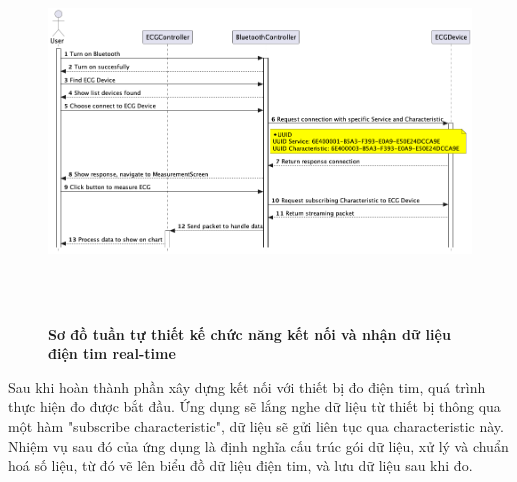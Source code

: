\begin{figure}[H]
  \centering
  \includegraphics[width=16cm,height=10cm]{Images/mobile_app/design_connect_and_receive_ECG_data.png}
  \caption[Sơ đồ tuần tự thiết kế chức năng kết nối và nhận dữ liệu điện tim real-time]{\bfseries \fontsize{12pt}{0pt}
  \selectfont Sơ đồ tuần tự thiết kế chức năng kết nối và nhận dữ liệu điện tim real-time}
  \label{seq_auth} %
\end{figure}

Sau khi hoàn thành phần xây dựng kết nối với thiết bị đo điện tim, quá trình thực hiện đo được bắt đầu. Ứng dụng sẽ lắng nghe
dữ liệu từ thiết bị thông qua một hàm "subscribe characteristic", dữ liệu sẽ gửi liên tục qua characteristic này. Nhiệm vụ sau đó của ứng dụng là
định nghĩa cấu trúc gói dữ liệu, xử lý và chuẩn hoá số liệu, từ đó vẽ lên biểu đồ dữ liệu điện tim, và lưu dữ liệu sau khi đo.

